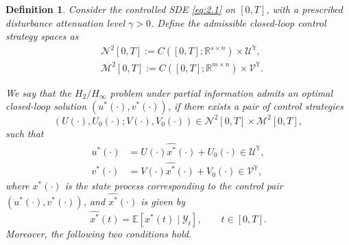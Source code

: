 \documentclass[10pt,a4paper]{amsart}
\newtheorem{defn}{Definition}
\begin{document}
\begin{defn}\label{defn:2.2}
	Consider the controlled SDE \eqref{eq:2.1} on $[0,T]$, with a prescribed disturbance attenuation level $\gamma > 0$. Define the admissible closed-loop control strategy spaces as
	\begin{equation*}
		\begin{aligned}
			&\mathcal{N}^2[0,T] := C([0,T];\mathbb{R}^{s \times n}) \times \mathcal{U}^{\mathbb{Y}},\\
			&\mathcal{M}^2[0,T] := C([0,T];\mathbb{R}^{m \times n}) \times \mathcal{V}^{\mathbb{Y}}.
		\end{aligned}
	\end{equation*}
	
	We say that the $H_2/H_{\infty}$ problem under partial information admits an optimal closed-loop solution $(u^*(\cdot),v^*(\cdot))$, if there exists a pair of control strategies
	\begin{equation*}
		(U(\cdot),U_0(\cdot);V(\cdot),V_0(\cdot)) \in \mathcal{N}^2[0,T] \times \mathcal{M}^2[0,T],
	\end{equation*}
	such that
	\begin{equation}\label{eq:2.3}
		\begin{aligned}
			u^*(\cdot) &= U(\cdot)\widehat{x^*}(\cdot) + U_0(\cdot) \in \mathcal{U}^{\mathbb{Y}},\\
			v^*(\cdot) &= V(\cdot)\widehat{x^*}(\cdot) + V_0(\cdot) \in \mathcal{V}^{\mathbb{Y}},
		\end{aligned}
	\end{equation}
	where $x^*(\cdot)$ is the state process corresponding to the control pair $(u^*(\cdot),v^*(\cdot))$, and $\widehat{x^*}(\cdot)$ is given by
	\[
	\widehat{x^*}(t) = \mathbb{E}[x^*(t)\mid \mathcal{Y}_t], \qquad t \in [0,T].
	\]
	Moreover, the following two conditions hold.
	

\end{defn}
\end{document}
